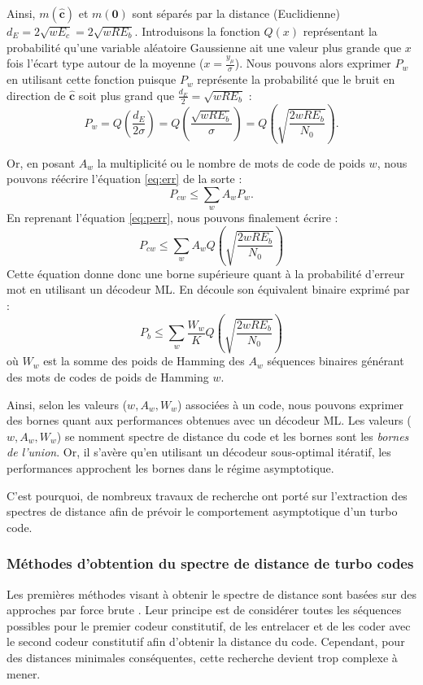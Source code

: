 Ainsi, $m(\mathbf{\hat{c}})$ et $m(\mathbf{0})$ sont séparés par la distance (Euclidienne) $d_E = 2\sqrt{wE_c} = 2\sqrt{wRE_b}$. 
Introduisons la fonction $Q(x)$ représentant la probabilité qu'une variable aléatoire Gaussienne ait une valeur plus 
grande que $x$ fois l'écart type autour de la moyenne ($x=\frac{y_\mu}{\sigma}$). Nous pouvons alors exprimer $P_w$ en 
utilisant cette fonction puisque $P_w$ représente la probabilité que le bruit en direction de $\mathbf{\hat{c}}$ soit 
plus grand que $\frac{d_E}{2} = \sqrt{wRE_b}$ : 
\begin{equation}\label{eq:perr}
	P_w = Q\left(\frac{d_E}{2\sigma}\right) = Q\left(\frac{\sqrt{wRE_b}}{\sigma}\right) = Q\left(\sqrt{\frac{2wRE_b}{N_0}}\right).  
\end{equation} 

Or, en posant $A_w$ la multiplicité ou le nombre de mots de code de poids $w$, nous pouvons réécrire l'équation \ref{eq:err} de la sorte : 
\[P_{cw} \le \sum\limits_w A_wP_w.\]
En reprenant l'équation \ref{eq:perr}, nous pouvons finalement écrire :
\begin{equation} \label{eq:uboundfer}
	P_{cw} \le \sum\limits_w A_w Q\left(\sqrt{\frac{2wRE_b}{N_0}}\right)
\end{equation}
Cette équation donne donc une borne supérieure quant à la probabilité d'erreur mot en utilisant un décodeur ML. En 
découle son équivalent binaire exprimé par :
\begin{equation} \label{eq:uboundber}
	P_{b} \le \sum\limits_w \frac{W_w}{K} Q\left(\sqrt{\frac{2wRE_b}{N_0}}\right)
\end{equation} 
où $W_w$ est la somme des poids de Hamming des $A_w$ séquences binaires générant  des mots de codes de poids de Hamming $w$.
	
Ainsi, selon les valeurs ($w,A_w,W_w$) associées à un code, nous pouvons exprimer des bornes quant aux performances 
obtenues avec un décodeur ML. Les valeurs ($w,A_w,W_w$) se nomment spectre de distance du code et les bornes sont les 
\emph{bornes de l'union}. Or, il s'avère qu'en utilisant un décodeur sous-optimal itératif, les performances approchent 
les bornes dans le régime asymptotique.
	
C'est pourquoi, de nombreux travaux de recherche ont porté sur l'extraction des spectres de distance afin de prévoir le 
comportement asymptotique d'un turbo code.
	
\subsubsection{Méthodes d'obtention du spectre de distance de turbo codes}\label{seq:spectre}
Les premières méthodes visant à obtenir le spectre de distance sont basées sur des approches par force brute \cite{illuminating}. 
Leur principe est de considérer toutes les séquences possibles pour le premier codeur constitutif, de les entrelacer et 
de les coder avec le second codeur constitutif afin d'obtenir la distance du code. Cependant, pour des distances minimales 
conséquentes, cette recherche devient trop complexe à mener.
	
